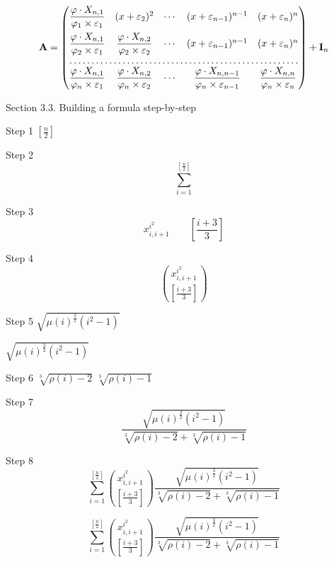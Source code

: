 \documentclass{article}
\begin{document}
\[
   \mathbf{A} =
   \begin{pmatrix}
     \quot{1}{1} & \exn{2} & \cdots & \exn{n - 1}&\exn{n}\\[10pt]
     \quot{1}{2} & \quot{2}{2} & \cdots & \exn{n - 1} &\exn{n}\\
     \hdotsfor{5}\\
     \quot{1}{n} & \quot{2}{n} & \cdots &
     \quot{n - 1}{n} & \quot{n}{n}
   \end{pmatrix}
   + \mathbf{I}_{n}
\]

Section 3.3. Building a formula step-by-step

Step 1
$\left[ \frac{n}{2} \right]$

Step 2
\[
   \sum_{i = 1}^{ \left[ \frac{n}{2} \right] }
\]

Step 3
\[
   x_{i, i + 1}^{i^{2}} \qquad \left[ \frac{i + 3}{3} \right]
\]

Step 4
\[
   \binom{ x_{i,i + 1}^{i^{2}} }{ \left[ \frac{i + 3}{3} \right] }
\]

Step 5
$\sqrt{ \mu(i)^{ \frac{3}{2} } (i^{2} - 1) }$

$\sqrt{ \mu(i)^{ \frac{3}{2} } (i^{2} - 1) }$

Step 6
$\sqrt[3]{ \rho(i) - 2 }$  $\sqrt[3]{ \rho(i) - 1 }$

Step 7
\[
   \frac{ \sqrt{ \mu(i)^{ \frac{3}{2}} (i^{2} -1) } }
        { \sqrt[3]{\rho(i) - 2} + \sqrt[3]{\rho(i) - 1} }
\]

Step 8
\[
   \sum_{i = 1}^{ \left[ \frac{n}{2} \right] }
      \binom{ x_{i, i + 1}^{i^{2}} }
            { \left[ \frac{i + 3}{3} \right] }
      \frac{ \sqrt{ \mu(i)^{ \frac{3}{2}} (i^{2} - 1) } }
           { \sqrt[3]{\rho(i) - 2} + \sqrt[3]{\rho(i) - 1} }
\]

\[\sum_{i=1}^{\left[\frac{n}{2}\right]}\binom{x_{i,i+1}^{i^{2}}}
{\left[\frac{i+3}{3}\right]}\frac{\sqrt{\mu(i)^{\frac{3}
{2}}(i^{2}-1)}}{\sqrt[3]{\rho(i)-2}+\sqrt[3]{\rho(i)-1}}\]

\end{document}
